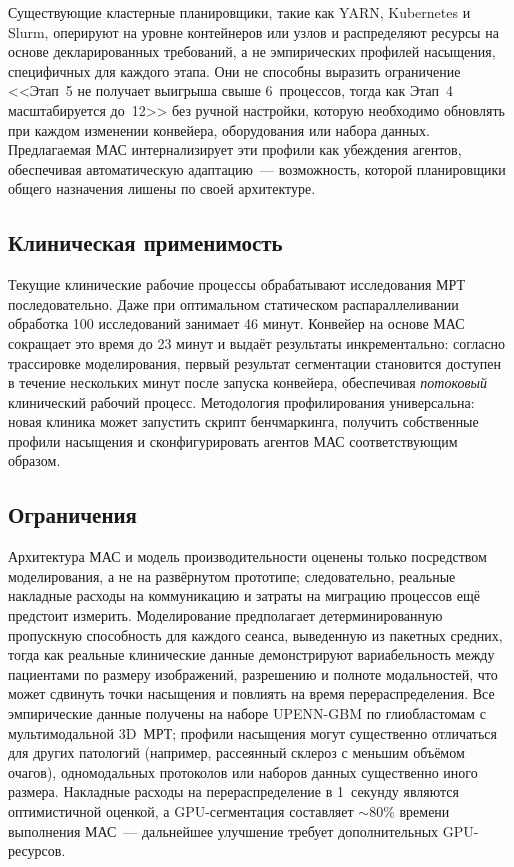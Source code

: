 \documentclass[conference]{IEEEtran}
\begin{document}
Существующие кластерные планировщики, такие как YARN, Kubernetes и Slurm, оперируют на уровне контейнеров или узлов и распределяют ресурсы на основе декларированных требований, а не эмпирических профилей насыщения, специфичных для каждого этапа. Они не способны выразить ограничение <<Этап~5 не получает выигрыша свыше 6~процессов, тогда как Этап~4 масштабируется до~12>> без ручной настройки, которую необходимо обновлять при каждом изменении конвейера, оборудования или набора данных. Предлагаемая МАС интернализирует эти профили как убеждения агентов, обеспечивая автоматическую адаптацию~--- возможность, которой планировщики общего назначения лишены по своей архитектуре.

\subsection{Клиническая применимость}

Текущие клинические рабочие процессы обрабатывают исследования МРТ последовательно. Даже при оптимальном статическом распараллеливании обработка 100 исследований занимает 46 минут. Конвейер на основе МАС сокращает это время до 23 минут и выдаёт результаты инкрементально: согласно трассировке моделирования, первый результат сегментации становится доступен в течение нескольких минут после запуска конвейера, обеспечивая \textit{потоковый} клинический рабочий процесс. Методология профилирования универсальна: новая клиника может запустить скрипт бенчмаркинга, получить собственные профили насыщения и сконфигурировать агентов МАС соответствующим образом.

\subsection{Ограничения}

Архитектура МАС и модель производительности оценены только посредством моделирования, а не на развёрнутом прототипе; следовательно, реальные накладные расходы на коммуникацию и затраты на миграцию процессов ещё предстоит измерить. Моделирование предполагает детерминированную пропускную способность для каждого сеанса, выведенную из пакетных средних, тогда как реальные клинические данные демонстрируют вариабельность между пациентами по размеру изображений, разрешению и полноте модальностей, что может сдвинуть точки насыщения и повлиять на время перераспределения. Все эмпирические данные получены на наборе UPENN-GBM по глиобластомам с мультимодальной 3D~МРТ; профили насыщения могут существенно отличаться для других патологий (например, рассеянный склероз с меньшим объёмом очагов), одномодальных протоколов или наборов данных существенно иного размера. Накладные расходы на перераспределение в 1~секунду являются оптимистичной оценкой, а GPU-сегментация составляет ${\sim}80\%$ времени выполнения МАС~--- дальнейшее улучшение требует дополнительных GPU-ресурсов.
\end{document}
